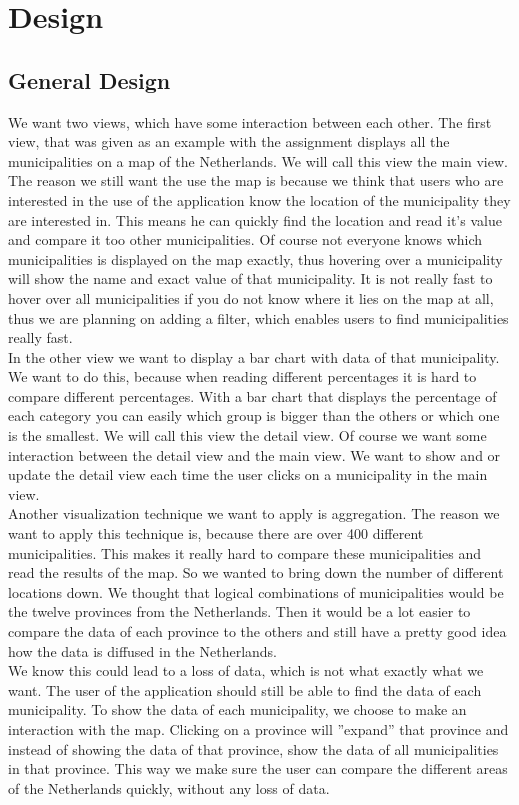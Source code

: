 \section{Design}\label{Sec:Des}
\subsection{General Design}
We want two views, which have some interaction between each other. The first view, that was given as an example with the assignment displays all the municipalities on a map of the Netherlands. We will call this view the main view. The reason we still want the use the map is because we think that users who are interested in the use of the application know the location of the municipality they are interested in. This means he can quickly find the location and read it's value and compare it too other municipalities. Of course not everyone knows which municipalities is displayed on the map exactly, thus hovering over a municipality will show the name and exact value of that municipality. It is not really fast to hover over all municipalities if you do not know where it lies on the map at all, thus we are planning on adding a filter, which enables users to find municipalities really fast. \\
In the other view we want to display a bar chart with data of that municipality.  We want to do this, because when reading different percentages it is hard to compare different percentages. With a bar chart that displays the percentage of each category you can easily which group is bigger than the others or which one is the smallest. We will call this view the detail view. Of course we want some interaction between the detail view and the main view. We want to show and or update the detail view each time the user clicks on a municipality in the main view. \\
Another visualization technique we want to apply is aggregation. The reason we want to apply this technique is, because there are over 400 different municipalities. This makes it really hard to compare these municipalities and read the results of the map. So we wanted to bring down the number of different locations down. We thought that logical combinations of municipalities would be the twelve provinces from the Netherlands. Then it would be a lot easier to compare the data of each province to the others and still have a pretty good idea how the data is diffused in the Netherlands. \\
We know this could lead to a loss of data, which is not what exactly what we want. The user of the application should still be able to find the data of each municipality. To show the data of each municipality, we choose to make an interaction with the map. Clicking on a province will ''expand'' that province and instead of showing the data of that province, show the data of all municipalities in that province. This way we make sure the user can compare the different areas of the Netherlands quickly, without any loss of data. \\
